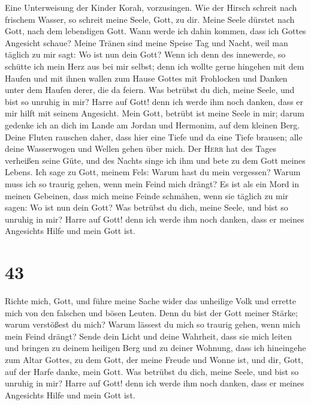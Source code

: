  Eine Unterweisung der Kinder Korah, vorzusingen.
 Wie der Hirsch schreit nach frischem Wasser, so schreit
meine Seele, Gott, zu dir.  Meine Seele dürstet nach Gott,
nach dem lebendigen Gott. Wann werde ich dahin kommen, dass ich Gottes
Angesicht schaue?  Meine Tränen sind meine Speise Tag und
Nacht, weil man täglich zu mir sagt: Wo ist nun dein Gott?
 Wenn ich denn des innewerde, so schütte ich mein Herz aus
bei mir selbst; denn ich wollte gerne hingehen mit dem Haufen und mit
ihnen wallen zum Hause Gottes mit Frohlocken und Danken unter dem Haufen
derer, die da feiern.  Was betrübst du dich, meine Seele,
und bist so unruhig in mir? Harre auf Gott! denn ich werde ihm noch
danken, dass er mir hilft mit seinem Angesicht.  Mein
Gott, betrübt ist meine Seele in mir; darum gedenke ich an dich im Lande
am Jordan und Hermonim, auf dem kleinen Berg.  Deine
Fluten rauschen daher, dass hier eine Tiefe und da eine Tiefe brausen;
alle deine Wasserwogen und Wellen gehen über mich.  Der
\textsc{Herr} hat des Tages verheißen seine Güte, und des Nachts singe
ich ihm und bete zu dem Gott meines Lebens.  Ich sage zu
Gott, meinem Fels: Warum hast du mein vergessen? Warum muss ich so
traurig gehen, wenn mein Feind mich drängt?  Es ist als
ein Mord in meinen Gebeinen, dass mich meine Feinde schmähen, wenn sie
täglich zu mir sagen: Wo ist nun dein Gott?  Was betrübst
du dich, meine Seele, und bist so unruhig in mir? Harre auf Gott! denn
ich werde ihm noch danken, dass er meines Angesichts Hilfe und mein Gott
ist.

\hypertarget{section-42}{%
\section{43}\label{section-42}}

 Richte mich, Gott, und führe meine Sache wider das
unheilige Volk und errette mich von den falschen und bösen Leuten.
 Denn du bist der Gott meiner Stärke; warum verstößest du
mich? Warum lässest du mich so traurig gehen, wenn mich mein Feind
drängt?  Sende dein Licht und deine Wahrheit, dass sie
mich leiten und bringen zu deinem heiligen Berg und zu deiner Wohnung,
 dass ich hineingehe zum Altar Gottes, zu dem Gott, der
meine Freude und Wonne ist, und dir, Gott, auf der Harfe danke, mein
Gott.  Was betrübst du dich, meine Seele, und bist so
unruhig in mir? Harre auf Gott! denn ich werde ihm noch danken, dass er
meines Angesichts Hilfe und mein Gott ist.

